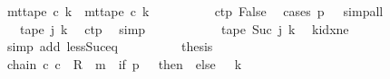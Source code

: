 \begin{isabellebody}
\ {\isachardoublequoteopen}mt{\isacharunderscore}{\kern0pt}tape\ c{\isacharprime}{\kern0pt}\ k\ {\isacharequal}{\kern0pt}\ mt{\isacharunderscore}{\kern0pt}tape\ c\ k{\isachardoublequoteclose}\isanewline
\ \ \ \ \ \ \ \ \isamarkupfalse%
\ c{\isacharprime}{\kern0pt}{\isacharunderscore}{\kern0pt}tp\ False\ \isamarkupfalse%
\ {\isacharparenleft}{\kern0pt}cases\ {\isachardoublequoteopen}{\isacharquery}{\kern0pt}p\ {\isacharequal}{\kern0pt}\ {}{\isachardoublequoteclose}{\isacharparenright}{\kern0pt}\ simp{\isacharunderscore}{\kern0pt}all\isanewline
\ \ \ \ \ \ \isamarkupfalse%
\ \isamarkupfalse%
\ {\isachardoublequoteopen}{\isasymdots}\ {\isacharequal}{\kern0pt}\ {\isacharquery}{\kern0pt}tape\ j\ k{\isachardoublequoteclose}\ \isamarkupfalse%
\ c{\isacharunderscore}{\kern0pt}tp\ \isamarkupfalse%
\ simp\isanewline
\ \ \ \ \ \ \isamarkupfalse%
\ \isamarkupfalse%
\ {\isachardoublequoteopen}{\isasymdots}\ {\isacharequal}{\kern0pt}\ {\isacharquery}{\kern0pt}tape\ {\isacharparenleft}{\kern0pt}Suc\ j{\isacharparenright}{\kern0pt}\ k{\isachardoublequoteclose}\ \isamarkupfalse%
\ kidx{\isacharunderscore}{\kern0pt}ne\ \isamarkupfalse%
\ {\isacharparenleft}{\kern0pt}simp\ add{\isacharcolon}{\kern0pt}\ less{\isacharunderscore}{\kern0pt}Suc{\isacharunderscore}{\kern0pt}eq{\isacharparenright}{\kern0pt}\isanewline
\ \ \ \ \ \ \isamarkupfalse%
\ \isamarkupfalse%
\ {\isacharquery}{\kern0pt}thesis\ \isakeywordONE{{\isachardot}{\kern0pt}}\isamarkupfalse%
\isanewline
\ \ \ \ \isamarkupfalse%
\isanewline
\ \ \isamarkupfalse%
\isanewline
\ \ \isamarkupfalse%
\ chain{\isacharcolon}{\kern0pt}\ {\isachardoublequoteopen}{\isacharparenleft}{\kern0pt}c{}{\isacharcomma}{\kern0pt}\ c{\isacharprime}{\kern0pt}{\isacharparenright}{\kern0pt}\ {\isasymin}\ R{\isacharprime}{\kern0pt}\ {\isacharcircum}{\kern0pt}{\isacharcircum}{\kern0pt}\ {\isacharparenleft}{\kern0pt}m\ {\isacharplus}{\kern0pt}\ {\isacharparenleft}{\kern0pt}if\ {\isacharquery}{\kern0pt}p\ {\isacharequal}{\kern0pt}\ {}\ then\ {}\ else\ {}\ {\isacharasterisk}{\kern0pt}\ {\isacharquery}{\kern0pt}k{\isacharparenright}{\kern0pt}{\isacharparenright}{\kern0pt}{\isachardoublequoteclose}\isanewline
\ \ \isamarkupfalse%
\ {\isacharminus}{\kern0pt}\isanewline
\ \ \ \ \isamarkupfalse%

\end{isabellebody}
